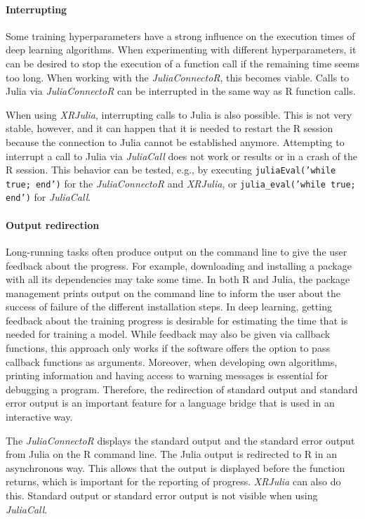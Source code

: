 \documentclass[12pt]{article}
\newcommand{\inlinecode}[1]{\texttt{#1}}
\newcommand{\apkg}[1]{\emph{#1}}
\begin{document}
\paragraph{Interrupting}\label{juliaconnectorinterrupting}

Some training hyperparameters have a strong influence on the execution times of deep learning algorithms.
When experimenting with different hyperparameters, it can be desired to stop the execution of a function call if the remaining time seems too long.
When working with the \apkg{JuliaConnectoR}, this becomes viable.
Calls to Julia via \apkg{JuliaConnectoR} can be interrupted in the same way as R function calls.

When using \apkg{XRJulia}, interrupting calls to Julia is also possible.
This is not very stable, however, and it can happen that it is needed to restart the R session because the connection to Julia cannot be established anymore.
Attempting to interrupt a call to Julia via \apkg{JuliaCall} does not work or results or in a crash of the R session.
This behavior can be tested, e.g., by executing \inlinecode{juliaEval('while true; end')} for the \apkg{JuliaConnectoR} and \apkg{XRJulia}, or \inlinecode{julia\_eval('while true; end')} for \apkg{JuliaCall}.

\paragraph{Output redirection}\label{juliaconnectorOutput}

Long-running tasks often produce output on the command line to give the user feedback about the progress.
For example, downloading and installing a package with all its dependencies may take some time.
In both R and Julia, the package management prints output on the command line to inform the user about the success of failure of the different installation steps.
In deep learning, getting feedback about the training progress is desirable for estimating the time that is needed for training a model.
While feedback may also be given via callback functions, this approach only works if the software offers the option to pass callback functions as arguments.
Moreover, when developing own algorithms, printing information and having access to warning messages is essential for debugging a program.
Therefore, the redirection of standard output and standard error output is an important feature for a language bridge that is used in an interactive way.

The \apkg{JuliaConnectoR} displays the standard output and the standard error output from Julia on the R command line.
The Julia output is redirected to R in an asynchronous way.
This allows that the output is displayed before the function returns, which is important for the reporting of progress.
\apkg{XRJulia} can also do this. Standard output or standard error output is not visible when using \apkg{JuliaCall}.
\clearpage
\end{document}

